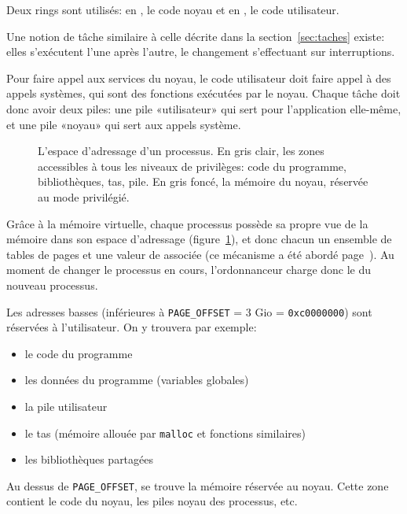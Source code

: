 Deux rings sont utilisés: en , le code noyau et en , le code
utilisateur.

Une notion de tâche similaire à celle décrite dans la section~\ref{sec:taches}
existe: elles s'exécutent l'une après l'autre, le changement s'effectuant sur
interruptions.

Pour faire appel aux services du noyau, le code utilisateur doit faire appel à
des appels systèmes, qui sont des fonctions exécutées par le noyau. Chaque tâche
doit donc avoir deux piles: une pile «utilisateur» qui sert pour
l'application elle-même, et une pile «noyau» qui sert aux appels système.

\begin{figure} %
\centering


\caption[Espace d'adressage d'un processus]{L'espace d'adressage d'un processus.
En gris clair, les zones accessibles à tous les niveaux de privilèges: code du
programme, bibliothèques, tas, pile. En gris foncé, la mémoire du noyau,
réservée au mode privilégié.}

\label{fig:memmap}
\end{figure}

Grâce à la mémoire virtuelle, chaque processus possède sa propre vue de la
mémoire dans son espace d'adressage (figure~\ref{fig:memmap}), et donc chacun un
ensemble de tables de pages et une valeur de \crtrois{} associée (ce mécanisme a
été abordé page~\pageref{page:mem-virt}). Au moment de changer le processus en
cours, l'ordonnanceur charge donc le \crtrois{} du nouveau processus.

Les adresses basses (inférieures à \texttt{PAGE\_OFFSET} = 3 Gio =
\texttt{0xc0000000}) sont réservées à l'utilisateur. On y trouvera par exemple:

\begin{itemize}
\item le code du programme
\item les données du programme (variables globales)
\item la pile utilisateur
\item le tas (mémoire allouée par \texttt{malloc} et fonctions similaires)
\item les bibliothèques partagées
\end{itemize}

Au dessus de \texttt{PAGE\_OFFSET}, se trouve la mémoire réservée au noyau.
Cette zone contient le code du noyau, les piles noyau des processus, etc.


